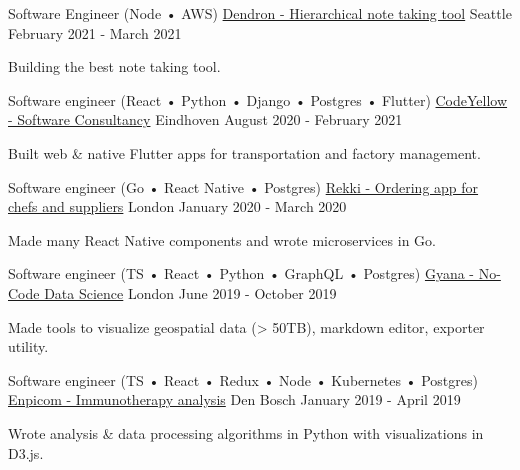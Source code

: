 

\begin{cventries}

  \cventry
    {Software Engineer (Node • AWS)}
    {\href{https://dendron.so}{Dendron - Hierarchical note taking tool}}
    {Seattle}
    {February 2021 - March 2021}
     {
      \begin{cvitems}
        \item {Building the best note taking tool.}
      \end{cvitems}
    }

  \cventry
    {Software engineer (React • Python • Django • Postgres • Flutter)}
    {\href{https://codeyellow.nl}{CodeYellow - Software Consultancy}}
    {Eindhoven}
    {August 2020 - February 2021}
     {
      \begin{cvitems}
        \item {Built web \& native Flutter apps for transportation and factory management.}
      \end{cvitems}
    }

  \cventry
    {Software engineer (Go • React Native • Postgres)}
    {\href{https://www.rekki.com}{Rekki - Ordering app for chefs and suppliers}}
    {London}
    {January 2020 - March 2020}
     {
      \begin{cvitems}
        \item {Made many React Native components and wrote microservices in Go.}
      \end{cvitems}
    }

  \cventry
    {Software engineer (TS • React • Python • GraphQL • Postgres)}
    {\href{https://www.gyana.com}{Gyana - No-Code Data Science}}
    {London}
    {June 2019 - October 2019}
     {
      \begin{cvitems}
        \item {Made tools to visualize geospatial data (> 50TB), markdown editor, exporter utility.}
      \end{cvitems}
    }

  \cventry
    {Software engineer (TS • React • Redux • Node • Kubernetes • Postgres)}
    {\href{https://www.enpicom.com}{Enpicom - Immunotherapy analysis}}
    {Den Bosch}
    {January 2019 - April 2019}
     {
      \begin{cvitems}
        \item {Wrote analysis \& data processing algorithms in Python with visualizations in D3.js.}
      \end{cvitems}
    }


\end{cventries}
